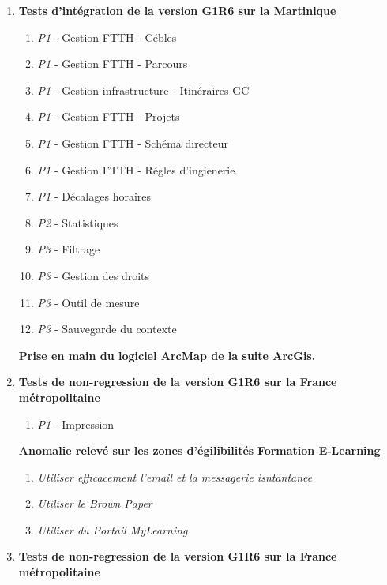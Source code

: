 \begin{enumerate}[label= Semaine \no\textbf{\arabic*.},itemsep=20pt]
\item \textbf{Tests d'intégration de la version G1R6 sur la Martinique}
\begin{enumerate}[label = Tests \no\arabic*.,align=left]
\item  \emph{\colorbox{rouge}{P1}} - Gestion FTTH - Cébles
\item \emph{\colorbox{rouge}{P1}} - Gestion FTTH - Parcours
\item \emph{\colorbox{rouge}{P1}} - Gestion infrastructure - Itinéraires GC
\item \emph{\colorbox{rouge}{P1}} - Gestion FTTH - Projets
\item \emph{\colorbox{rouge}{P1}} - Gestion FTTH - Schéma directeur
\item \emph{\colorbox{rouge}{P1}} - Gestion FTTH - Régles d'ingienerie
\item \emph{\colorbox{rouge}{P1}} - Décalages horaires
\item \emph{\colorbox{rouge-clair}{P2}} - Statistiques
\item \emph{\colorbox{rouge-tres-clair}{P3}} - Filtrage
\item \emph{\colorbox{rouge-tres-clair}{P3}} - Gestion des droits
\item \emph{\colorbox{rouge-tres-clair}{P3}} - Outil de mesure
\item \emph{\colorbox{rouge-tres-clair}{P3}} - Sauvegarde du contexte
\end{enumerate}
\textbf{Prise en main du logiciel ArcMap de la suite ArcGis.}
\item \textbf{Tests de non-regression de la version G1R6 sur la France métropolitaine}
\begin{enumerate}[label = Tests \no\arabic*.,align=left]
\item  \emph{\colorbox{rouge}{P1}} - Impression
\end{enumerate}
\textbf{Anomalie relevé sur les zones d'égilibilités}
\newline
\textbf{Formation E-Learning}
\begin{enumerate}[label = Formation \no\arabic*.,align=left]
	\item \textit{Utiliser efficacement l'email et la messagerie isntantanee}
	\item \textit{Utiliser le Brown Paper}
	\item \textit{Utiliser du Portail MyLearning}
\end{enumerate}
\item \textbf{Tests de non-regression de la version G1R6 sur la France métropolitaine}

\end{enumerate}
